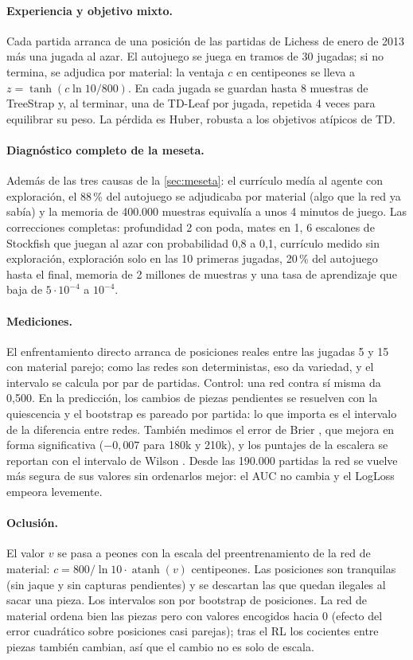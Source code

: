 \documentclass[11pt,a4paper]{article}
\begin{document}
\paragraph{Experiencia y objetivo mixto.} Cada partida arranca de una
posición de las partidas de Lichess de enero de 2013 más una jugada al azar. El autojuego se
juega en tramos de 30 jugadas; si no termina, se adjudica por material: la
ventaja $c$ en centipeones se lleva a $z=\tanh(c\ln10/800)$. En cada jugada
se guardan hasta 8 muestras de TreeStrap y, al terminar, una de TD-Leaf por
jugada, repetida 4 veces para equilibrar su peso. La pérdida es Huber,
robusta a los objetivos atípicos de TD.

\paragraph{Diagnóstico completo de la meseta.} Además de las tres causas de
la \cref{sec:meseta}: el currículo medía al agente con exploración, el
88\,\% del autojuego se adjudicaba por material (algo que la red ya sabía)
y la memoria de 400.000 muestras equivalía a unos 4 minutos de juego. Las
correcciones completas: profundidad 2 con poda, mates en 1, 6 escalones de
Stockfish que juegan al azar con probabilidad 0,8 a 0,1, currículo medido
sin exploración, exploración solo en las 10 primeras jugadas, 20\,\% del
autojuego hasta el final, memoria de 2 millones de muestras y una tasa de
aprendizaje que baja de $5\cdot10^{-4}$ a $10^{-4}$.

\paragraph{Mediciones.} El enfrentamiento directo arranca de posiciones
reales entre las jugadas 5 y 15 con material parejo; como las redes son
deterministas, eso da variedad, y el intervalo se calcula por par de
partidas. Control: una red contra sí misma da 0,500. En la predicción, los
cambios de piezas pendientes se resuelven con la quiescencia y el bootstrap
es pareado por partida: lo que importa es el intervalo de la diferencia
entre redes. También medimos el error de Brier \citep{brier1950}, que
mejora en forma significativa ($-0,007$ para 180k y 210k), y los puntajes
de la escalera se reportan con el intervalo de Wilson \citep{wilson1927}.
Desde las 190.000 partidas la red se vuelve más segura de sus valores sin
ordenarlos mejor: el AUC no cambia y el LogLoss empeora levemente.

\paragraph{Oclusión.} El valor $v$ se pasa a peones con la escala del
preentrenamiento de la red de material:
$c=800/\ln 10\cdot\operatorname{atanh}(v)$ centipeones. Las posiciones son
tranquilas (sin jaque y sin capturas pendientes) y se descartan las que
quedan ilegales al sacar una pieza. Los intervalos son por bootstrap de
posiciones. La red de material ordena bien las piezas pero con valores
encogidos hacia 0 (efecto del error cuadrático sobre posiciones casi
parejas); tras el RL los cocientes entre piezas también cambian, así que el
cambio no es solo de escala.
\end{document}
